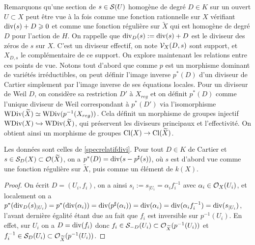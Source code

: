 Remarquons qu'une section de $s\in \mathcal{S}(U)$ homogène de degré $D\in K$ sur un ouvert $U\subset X$ peut être vue à la fois comme une fonction rationnelle sur $X$ vérifiant $\operatorname{div}(s)+D\geqslant 0$ et comme une fonction régulière sur $\widetilde{X}$ qui est homogène de degré $D$ pour l'action de $H$. On rappelle que $\operatorname{div}_D(s):=\operatorname{div}(s)+D$ est le diviseur des zéros de $s$ sur $X$. C'est un diviseur effectif, on note $\mathcal{V}_X(D,s)$ sont support, et $X_{D,s}$ le complémentaire de ce support. On explore maintenant les relations entre ces points de vue. Notons tout d'abord que comme $p$ est un morphisme dominant de variétés irréductibles, on peut définir l'image inverse $p^*(D)$ d'un diviseur de Cartier simplement par l'image inverse de ses équations locales. Pour un diviseur de Weil $D$, on considère sa restriction $D'$ à $X_{reg}$ et on définit $p^*(D)$ comme l'unique diviseur de Weil correspondant à $p^*(D')$ via l'isomorphisme $\operatorname{WDiv}(\widetilde{X})\simeq\operatorname{WDiv}(p^{-1}(X_{reg}))$. Cela définit un morphisme de groupes injectif $\operatorname{WDiv}(X)\xhookrightarrow{}\operatorname{WDiv}(\widetilde{X})$, qui préservent les diviseurs principaux et l'effectivité. On obtient ainsi un morphisme de groupes $\operatorname{Cl}(X)\rightarrow \operatorname{Cl}(\widetilde{X})$.

\begin{prop}\label{pstarPrincipalCartier}
Les données sont celles de \ref{specrelatifdivi}. Pour tout $D\in K$ de Cartier et $s\in\mathcal{S}_D(X)\subset \mathcal{O}(\widetilde{X})$, on a $p^*(D)=\operatorname{div}(s-p^\sharp(s))$, où $s$ est d'abord vue comme une fonction régulière sur $\widetilde{X}$, puis comme un élément de $k(X)$.
\end{prop}
\begin{proof}
On écrit $D=(U_i, f_i)$, on a ainsi $s_i:=s_{|U_i}=\alpha_i f_i^{-1}$ avec $\alpha_i\in \mathcal{O}_X(U_i)$, et localement on a $p^*(\operatorname{div}_D(s)_{|U_i})=p^*(\operatorname{div}(\alpha_i))=\operatorname{div}(p^\sharp(\alpha_i))=\operatorname{div}(\alpha_i)=\operatorname{div}(\alpha_i f_i^{-1})=\operatorname{div}(s_{|U_i})$, l'avant dernière égalité étant due au fait que $f_i$ est inversible sur $p^{-1}(U_i)$. En effet, sur $U_i$ on a $D=\operatorname{div}(f_i)$ donc $f_i\in \mathcal{S}_{-D}(U_i)\subset\mathcal{O}_{\widetilde{X}}(p^{-1}(U_i))$ et $f_i^{-1}\in \mathcal{S}_D(U_i)\subset\mathcal{O}_{\widetilde{X}}(p^{-1}(U_i))$.
\end{proof}

